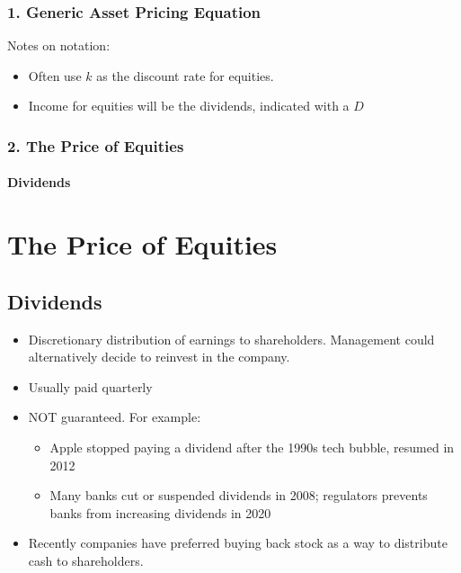 \documentclass{beamer}
\begin{document}
\begin{frame}[t]
    \frametitle{1. Generic Asset Pricing Equation}

    Notes on notation:
    \begin{itemize}
        \item Often use $k$ as the discount rate for equities.
        \item Income for equities will be the dividends, indicated with a $D$
    \end{itemize}

\end{frame}

\begin{frame}[t]
    \frametitle{2. The Price of Equities}
    \framesubtitle{Dividends}
    \section{The Price of Equities}
    \subsection{Dividends}

    \begin{itemize}
        \item Discretionary distribution of earnings to shareholders.   Management could alternatively decide to reinvest in the company.
        \item Usually paid quarterly
        \item NOT guaranteed.   For example:
        \begin{itemize}
            \item Apple stopped paying a dividend after the 1990s tech bubble, resumed in 2012
            \item Many banks cut or suspended dividends in 2008; regulators prevents banks from increasing dividends in 2020
        \end{itemize}
        \item Recently companies have preferred buying back stock as a way to distribute cash to shareholders.
    \end{itemize}

\end{frame}
\end{document}
